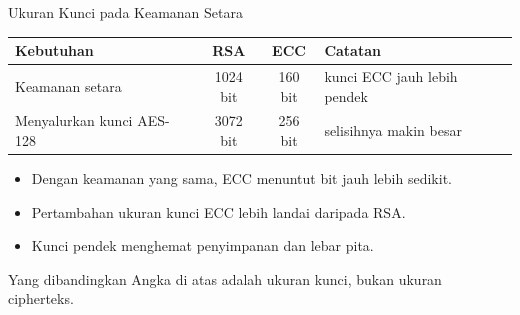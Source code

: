 \documentclass[aspectratio=169,11pt]{beamer}
\begin{document}
\begin{frame}{Ukuran Kunci pada Keamanan Setara}
    \footnotesize
    \begin{tabularx}{\linewidth}{@{}>{\raggedright\arraybackslash}p{5.0cm}
                                  c c >{\raggedright\arraybackslash}X@{}}
        \toprule
        \textbf{Kebutuhan} & \textbf{RSA} & \textbf{ECC} & \textbf{Catatan} \\
        \midrule
        Keamanan setara & 1024 bit & 160 bit &
        kunci ECC jauh lebih pendek \\
        \addlinespace
        Menyalurkan kunci AES-128 & 3072 bit & 256 bit &
        selisihnya makin besar \\
        \bottomrule
    \end{tabularx}
    \vspace{0.3cm}
    \begin{itemize}
        \item Dengan keamanan yang sama, ECC menuntut bit jauh lebih sedikit.
        \item Pertambahan ukuran kunci ECC lebih landai daripada RSA.
        \item Kunci pendek menghemat penyimpanan dan lebar pita.
    \end{itemize}
    \begin{alertblock}{Yang dibandingkan}
        \footnotesize
        Angka di atas adalah ukuran kunci, bukan ukuran cipherteks.
    \end{alertblock}
\end{frame}
\end{document}
